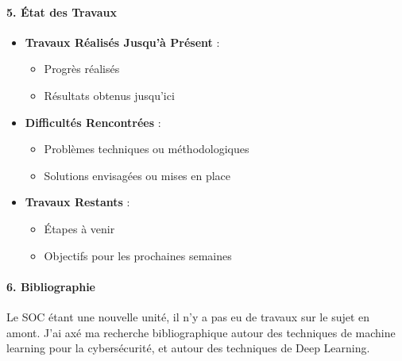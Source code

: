 \documentclass[
  letterpaper,
  DIV=11,
  numbers=noendperiod]{scrartcl}
\let\oldparagraph\paragraph
\renewcommand{\paragraph}[1]{\oldparagraph{#1}\mbox{}}
\providecommand{\tightlist}{%
  \setlength{\itemsep}{0pt}\setlength{\parskip}{0pt}}\usepackage{longtable,booktabs,array}
\begin{document}
\paragraph{5. État des Travaux}\label{uxe9tat-des-travaux}

\begin{itemize}
\tightlist
\item
  \textbf{Travaux Réalisés Jusqu'à Présent} :

  \begin{itemize}
  \tightlist
  \item
    Progrès réalisés
  \item
    Résultats obtenus jusqu'ici
  \end{itemize}
\item
  \textbf{Difficultés Rencontrées} :

  \begin{itemize}
  \tightlist
  \item
    Problèmes techniques ou méthodologiques
  \item
    Solutions envisagées ou mises en place
  \end{itemize}
\item
  \textbf{Travaux Restants} :

  \begin{itemize}
  \tightlist
  \item
    Étapes à venir
  \item
    Objectifs pour les prochaines semaines
  \end{itemize}
\end{itemize}

\paragraph{6. Bibliographie}\label{bibliographie}

Le SOC étant une nouvelle unité, il n'y a pas eu de travaux sur le sujet
en amont. J'ai axé ma recherche bibliographique autour des techniques de
machine learning pour la cybersécurité, et autour des techniques de Deep
Learning.
\end{document}
